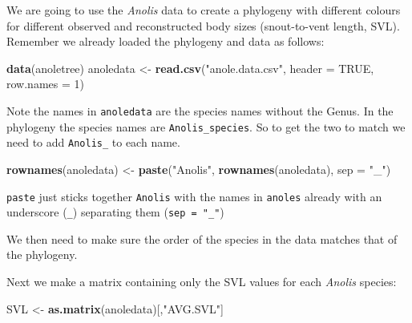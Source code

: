 \documentclass[]{book}
\newenvironment{Shaded}{\begin{snugshade}}{\end{snugshade}}
\newcommand{\KeywordTok}[1]{\textcolor[rgb]{0.13,0.29,0.53}{\textbf{{#1}}}}
\newcommand{\DataTypeTok}[1]{\textcolor[rgb]{0.13,0.29,0.53}{{#1}}}
\newcommand{\DecValTok}[1]{\textcolor[rgb]{0.00,0.00,0.81}{{#1}}}
\newcommand{\StringTok}[1]{\textcolor[rgb]{0.31,0.60,0.02}{{#1}}}
\newcommand{\OtherTok}[1]{\textcolor[rgb]{0.56,0.35,0.01}{{#1}}}
\newcommand{\NormalTok}[1]{{#1}}
\theoremstyle{definition}
\theoremstyle{definition}
\theoremstyle{definition}
\theoremstyle{remark}
\begin{document}
We are going to use the \emph{Anolis} data to create a phylogeny with
different colours for different observed and reconstructed body sizes
(snout-to-vent length, SVL). Remember we already loaded the phylogeny
and data as follows:

\begin{Shaded}
\begin{Highlighting}[]
\KeywordTok{data}\NormalTok{(anoletree)}
\NormalTok{anoledata <-}\StringTok{ }\KeywordTok{read.csv}\NormalTok{(}\StringTok{"anole.data.csv"}\NormalTok{, }\DataTypeTok{header =} \OtherTok{TRUE}\NormalTok{, }\DataTypeTok{row.names =} \DecValTok{1}\NormalTok{) }
\end{Highlighting}
\end{Shaded}

Note the names in \texttt{anoledata} are the species names without the
Genus. In the phylogeny the species names are \texttt{Anolis\_species}.
So to get the two to match we need to add \texttt{Anolis\_} to each
name.

\begin{Shaded}
\begin{Highlighting}[]
\KeywordTok{rownames}\NormalTok{(anoledata) <-}\StringTok{ }\KeywordTok{paste}\NormalTok{(}\StringTok{"Anolis"}\NormalTok{, }\KeywordTok{rownames}\NormalTok{(anoledata), }\DataTypeTok{sep =} \StringTok{"_"}\NormalTok{)}
\end{Highlighting}
\end{Shaded}

\texttt{paste} just sticks together \texttt{Anolis} with the names in
\texttt{anoles} already with an underscore (\texttt{\_}) separating them
(\texttt{sep\ =\ "\_"})

We then need to make sure the order of the species in the data matches
that of the phylogeny.

\begin{Shaded}
\end{Shaded}

Next we make a matrix containing only the SVL values for each
\emph{Anolis} species:

\begin{Shaded}
\begin{Highlighting}[]
\NormalTok{SVL <-}\StringTok{ }\KeywordTok{as.matrix}\NormalTok{(anoledata)[,}\StringTok{"AVG.SVL"}\NormalTok{]}
\end{Highlighting}
\end{Shaded}
\end{document}
